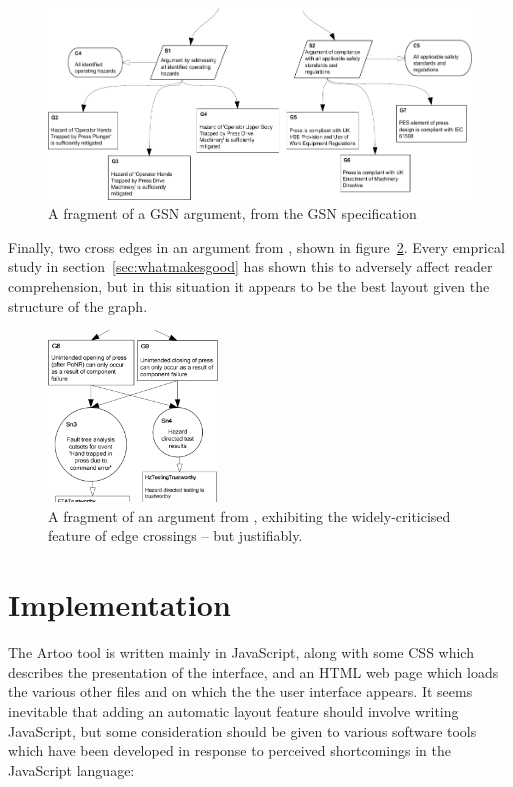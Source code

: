 \begin{figure}
    \includegraphics[width=\textwidth]{graphics/unaligned_siblings.pdf}
    \caption{A fragment of a GSN argument,
            from the GSN specification \citep[figure~42, section~2.3.6.5, pp.~34]{gsnstandard}}
    \label{fig:unalignedsiblings}
\end{figure}

Finally, two cross edges in an argument from \cite{Hbli:2006:PPC:1183088.1183090}, shown in figure~\ref{fig:cross}. Every emprical study in section~\ref{sec:whatmakesgood} has shown this to adversely affect reader comprehension, but in this situation it appears to be the best layout given the structure of the graph.

\begin{figure}
    \includegraphics[width=0.4\textwidth]{graphics/cross.png}
    \caption{A fragment of an argument from \cite{Hbli:2006:PPC:1183088.1183090}, exhibiting the widely-criticised feature of edge crossings -- but justifiably.}
    \label{fig:cross}
\end{figure}


\section{Implementation}

The Artoo tool is written mainly in JavaScript, along with some CSS which describes the presentation of the interface, and an HTML web page which loads the various other files and on which the the user interface appears. It seems inevitable that adding an automatic layout feature should involve writing JavaScript, but some consideration should be given to various software tools which have been developed in response to perceived shortcomings in the JavaScript language:

